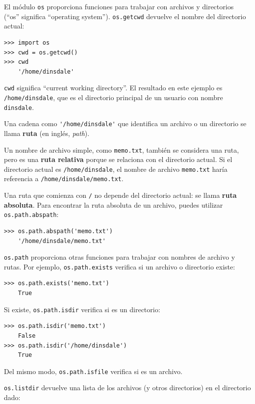 \documentclass[10pt]{book}
\begin{document}
El módulo {\tt os} proporciona funciones para trabajar con archivos y
directorios (``os'' significa ``operating system'').  {\tt os.getcwd}
devuelve el nombre del directorio actual:

\begin{verbatim}
>>> import os
>>> cwd = os.getcwd()
>>> cwd
    '/home/dinsdale'
\end{verbatim}
%
{\tt cwd} significa ``current working directory''.  El resultado en
este ejemplo es {\tt /home/dinsdale}, que es el directorio principal de un
usuario con nombre {\tt dinsdale}.

Una cadena como \verb"'/home/dinsdale'" que identifica un archivo o un
directorio se llama {\bf ruta} (en inglés, {\em path}).

Un nombre de archivo simple, como {\tt memo.txt}, también se considera una ruta,
pero es una {\bf ruta relativa} porque se relaciona con el directorio
actual.  Si el directorio actual es {\tt /home/dinsdale}, el
nombre de archivo {\tt memo.txt} haría referencia a {\tt /home/dinsdale/memo.txt}.
 
 

Una ruta que comienza con {\tt /} no depende del directorio
actual: se llama {\bf ruta absoluta}.  Para encontrar la ruta
absoluta de un archivo, puedes utilizar {\tt os.path.abspath}:

\begin{verbatim}
>>> os.path.abspath('memo.txt')
    '/home/dinsdale/memo.txt'
\end{verbatim}
%
{\tt os.path} proporciona otras funciones para trabajar con nombres de archivo
y rutas.  Por ejemplo,
{\tt os.path.exists} verifica
si un archivo o directorio existe:

\begin{verbatim}
>>> os.path.exists('memo.txt')
    True
\end{verbatim}
%
Si existe, {\tt os.path.isdir} verifica si es un directorio:

\begin{verbatim}
>>> os.path.isdir('memo.txt')
    False
>>> os.path.isdir('/home/dinsdale')
    True
\end{verbatim}
%
Del mismo modo, {\tt os.path.isfile} verifica si es un archivo.

{\tt os.listdir} devuelve una lista de los archivos (y otros directorios)
en el directorio dado:
\end{document}
